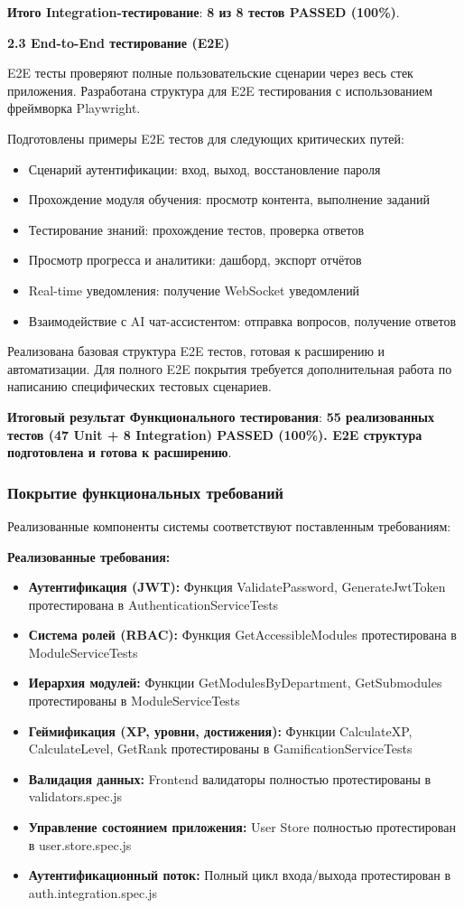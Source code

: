 \textbf{Итого Integration-тестирование}: \textbf{8 из 8 тестов PASSED (100\%)}.

\textbf{2.3 End-to-End тестирование (E2E)}

E2E тесты проверяют полные пользовательские сценарии через весь стек приложения. Разработана структура для E2E тестирования с использованием фреймворка Playwright.

Подготовлены примеры E2E тестов для следующих критических путей:
\begin{itemize}
	\item Сценарий аутентификации: вход, выход, восстановление пароля
	\item Прохождение модуля обучения: просмотр контента, выполнение заданий
	\item Тестирование знаний: прохождение тестов, проверка ответов
	\item Просмотр прогресса и аналитики: дашборд, экспорт отчётов
	\item Real-time уведомления: получение WebSocket уведомлений
	\item Взаимодействие с AI чат-ассистентом: отправка вопросов, получение ответов
\end{itemize}

Реализована базовая структура E2E тестов, готовая к расширению и автоматизации. Для полного E2E покрытия требуется дополнительная работа по написанию специфических тестовых сценариев.

\textbf{Итоговый результат Функционального тестирования}: \textbf{55 реализованных тестов (47 Unit + 8 Integration) PASSED (100\%). E2E структура подготовлена и готова к расширению}.

\subsubsection*{Покрытие функциональных требований}

Реализованные компоненты системы соответствуют поставленным требованиям:

\textbf{Реализованные требования:}
\begin{itemize}
	\item \textbf{Аутентификация (JWT):} Функция ValidatePassword, GenerateJwtToken протестирована в AuthenticationServiceTests
	\item \textbf{Система ролей (RBAC):} Функция GetAccessibleModules протестирована в ModuleServiceTests
	\item \textbf{Иерархия модулей:} Функции GetModulesByDepartment, GetSubmodules протестированы в ModuleServiceTests
	\item \textbf{Геймификация (XP, уровни, достижения):} Функции CalculateXP, CalculateLevel, GetRank протестированы в GamificationServiceTests
	\item \textbf{Валидация данных:} Frontend валидаторы полностью протестированы в validators.spec.js
	\item \textbf{Управление состоянием приложения:} User Store полностью протестирован в user.store.spec.js
	\item \textbf{Аутентификационный поток:} Полный цикл входа/выхода протестирован в auth.integration.spec.js
\end{itemize}

